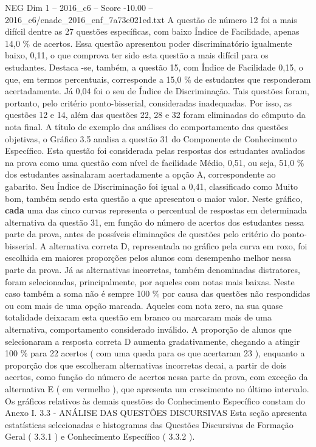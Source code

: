 \begin{textsample}{NEG Dim 1 – 2016\_c6 – Score -10.00 – 2016\_c6/enade\_2016\_enf\_7a73e021ed.txt}
A questão de número 12 foi a mais difícil dentre as 27 questões específicas, com baixo Índice de Facilidade, apenas 14,0 \% de acertos.
Essa questão apresentou poder discriminatório igualmente baixo, 0,11, o que comprova ter sido esta questão a mais difícil para os estudantes.
Destaca -se, também, a questão 15, com Índice de Facilidade 0,15, o que, em termos percentuais, corresponde a 15,0 \% de estudantes que responderam acertadamente.
Já 0,04 foi o seu de Índice de Discriminação.
Tais questões foram, portanto, pelo critério ponto-bisserial, consideradas inadequadas.
Por isso, as questões 12 e 14, além das questões 22, 28 e 32 foram eliminadas do cômputo da nota final.
A título de exemplo das análises do comportamento das questões objetivas, o Gráfico 3.5 analisa a questão 31 do Componente de Conhecimento Específico.
Esta questão foi considerada pelas respostas dos estudantes avaliados na prova como uma questão com nível de facilidade Médio, 0,51, ou seja, 51,0 \% dos estudantes assinalaram acertadamente a opção A, correspondente ao gabarito.
Seu Índice de Discriminação foi igual a 0,41, classificado como Muito bom, também sendo esta questão a que apresentou o maior valor.
Neste gráfico, \textbf{cada} uma das cinco curvas representa o percentual de respostas em determinada alternativa da questão 31, em função do número de acertos dos estudantes nessa parte da prova, antes de possíveis eliminações de questões pelo critério do ponto-bisserial.
A alternativa correta D, representada no gráfico pela curva em roxo, foi escolhida em maiores proporções pelos alunos com desempenho melhor nessa parte da prova.
Já as alternativas incorretas, também denominadas distratores, foram selecionadas, principalmente, por aqueles com notas mais baixas.
Neste caso também a soma não é sempre 100 \% por causa das questões não respondidas ou com mais de uma opção marcada.
Aqueles com nota zero, na sua quase totalidade deixaram esta questão em branco ou marcaram mais de uma alternativa, comportamento considerado inválido.
A proporção de alunos que selecionaram a resposta correta D aumenta gradativamente, chegando a atingir 100 \% para 22 acertos ( com uma queda para os que acertaram 23 ), enquanto a proporção dos que escolheram alternativas incorretas decai, a partir de dois acertos, como função do número de acertos nessa parte da prova, com exceção da alternativa E ( em vermelho ), que apresenta um crescimento no último intervalo.
Os gráficos relativos às demais questões do Conhecimento Específico constam do Anexo I. 3.3 - ANÁLISE DAS QUESTÕES DISCURSIVAS Esta seção apresenta estatísticas selecionadas e histogramas das Questões Discursivas de Formação Geral ( 3.3.1 ) e Conhecimento Específico ( 3.3.2 ).

\end{textsample}
